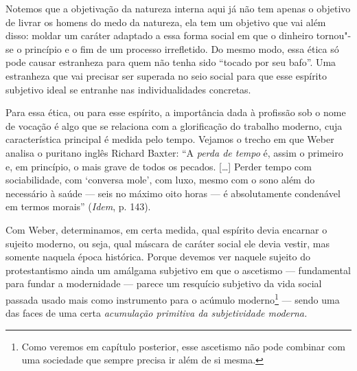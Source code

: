 Notemos que a objetivação da natureza interna aqui já não tem
apenas o objetivo de livrar os homens do medo da natureza, ela tem um
objetivo que vai além disso: moldar um caráter adaptado a essa forma
social em que o dinheiro tornou"-se o princípio e o fim de um processo
irrefletido. Do mesmo modo, essa ética só pode causar estranheza para
quem não tenha sido ``tocado por seu bafo''. Uma estranheza que vai
precisar ser superada no seio social para que esse espírito subjetivo
ideal se entranhe nas individualidades concretas.

Para essa ética, ou para esse espírito, a importância dada à profissão
sob o nome de vocação é algo que se relaciona com a glorificação do
trabalho moderno, cuja característica principal é medida pelo tempo.
Vejamos o trecho em que Weber analisa o puritano inglês Richard Baxter:
``A \emph{perda de tempo} é, assim o primeiro e, em princípio, o mais
grave de todos os pecados. [\ldots{}] Perder tempo com
sociabilidade, com `conversa mole', com luxo, mesmo com o sono além do
necessário à saúde --- seis no máximo oito horas --- é absolutamente
condenável em termos morais'' (\emph{Idem}, p. 143).

Com Weber, determinamos, em certa medida, qual espírito devia encarnar o
sujeito moderno, ou seja, qual máscara de caráter social ele devia
vestir, mas somente naquela época histórica. Porque devemos ver
naquele sujeito do protestantismo ainda um amálgama
subjetivo em que o ascetismo --- fundamental para fundar a modernidade ---
parece um resquício subjetivo da vida social passada usado mais como
instrumento para o acúmulo moderno\footnote{Como veremos em capítulo
  posterior, esse ascetismo não pode combinar com uma sociedade que
  sempre precisa ir além de si mesma.} --- sendo uma das faces de uma
certa \emph{acumulação primitiva da subjetividade moderna.}

